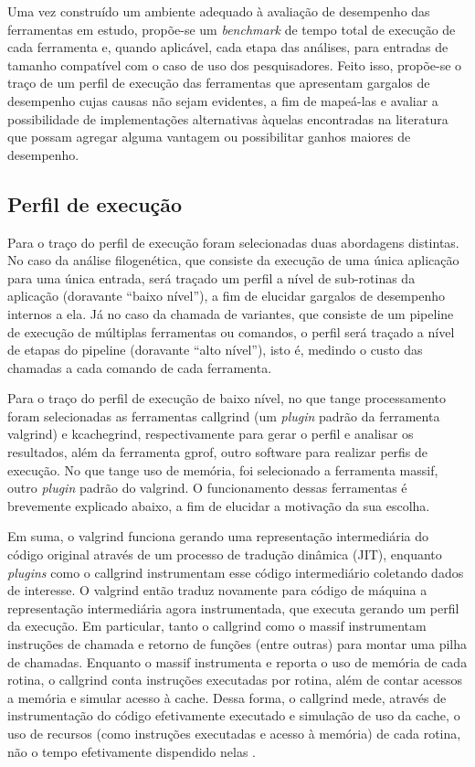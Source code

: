 \documentclass[cic,tc]{iiufrgs}
\begin{document}
{Uma vez construído um ambiente adequado à avaliação de desempenho das
ferramentas em estudo, propõe-se um \textit{benchmark} de tempo total de execução de
cada ferramenta e, quando aplicável, cada etapa das análises, para entradas de
tamanho compatível com o caso de uso dos pesquisadores. Feito isso, propõe-se o
traço de um perfil de execução das ferramentas que apresentam gargalos de
desempenho cujas causas não sejam evidentes, a fim de mapeá-las e avaliar a
possibilidade de implementações alternativas àquelas encontradas na literatura
que possam agregar alguma vantagem ou possibilitar ganhos maiores de
desempenho.

\subsection{Perfil de execução}

Para o traço do perfil de execução foram selecionadas duas abordagens
distintas. No caso da análise filogenética, que consiste da execução de uma
única aplicação para uma única entrada, será traçado um perfil a nível de
sub-rotinas da aplicação (doravante ``baixo nível''), a fim de elucidar gargalos
de desempenho internos a ela. Já no caso da chamada de variantes, que consiste
de um pipeline de execução de múltiplas ferramentas ou comandos, o perfil será
traçado a nível de etapas do pipeline (doravante ``alto nível''), isto é,
medindo o custo das chamadas a cada comando de cada ferramenta.

Para o traço do perfil de execução de baixo nível, no que tange processamento
foram selecionadas as ferramentas callgrind (um \textit{plugin} padrão da ferramenta
valgrind) e kcachegrind, respectivamente para gerar o perfil e analisar os
resultados, além da ferramenta gprof, outro software para realizar perfis de
execução. No que tange uso de memória, foi selecionado a ferramenta massif,
outro \textit{plugin} padrão do valgrind. O funcionamento dessas ferramentas é
brevemente explicado abaixo, a fim de elucidar a motivação da sua escolha.

Em suma, o valgrind funciona gerando uma representação intermediária do código
original através de um processo de tradução dinâmica (JIT), enquanto \textit{plugins}
como o callgrind instrumentam esse código intermediário coletando dados de
interesse. O valgrind então traduz novamente para código de máquina a
representação intermediária agora instrumentada, que executa gerando um perfil
da execução. Em particular, tanto o callgrind como o massif instrumentam
instruções de chamada e retorno de funções (entre outras) para montar uma pilha
de chamadas. Enquanto o massif instrumenta e reporta o uso de memória de cada
rotina, o callgrind conta instruções executadas por rotina, além de contar
acessos a memória e simular acesso à cache. Dessa forma, o callgrind mede,
através de instrumentação do código efetivamente executado e simulação de uso
da cache, o uso de recursos (como instruções executadas e acesso à memória) de
cada rotina, não o tempo efetivamente dispendido
nelas \cite{weidendorfer2008sequential}.

}
\end{document}
